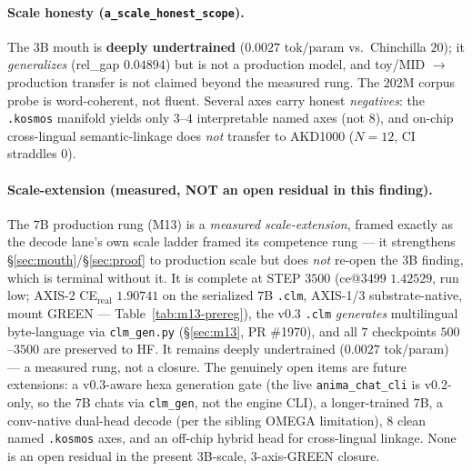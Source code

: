 \documentclass[11pt]{article}
\begin{document}
\paragraph{Scale honesty (\texttt{a\_scale\_honest\_scope}).} The $3$B mouth is
\textbf{deeply undertrained} ($0.0027$ tok/param vs.\ Chinchilla $20$); it
\emph{generalizes} (rel\_gap $0.04894$) but is not a production model, and toy/MID
$\rightarrow$ production transfer is not claimed beyond the measured rung. The
$202$M corpus probe is word-coherent, not fluent. Several axes carry honest
\emph{negatives}: the \texttt{.kosmos} manifold yields only $3$--$4$ interpretable
named axes (not $8$), and on-chip cross-lingual semantic-linkage does \emph{not}
transfer to AKD1000 ($N=12$, CI straddles $0$).

\paragraph{Scale-extension (measured, NOT an open residual in this finding).}
The $7$B production rung (M13) is a \emph{measured scale-extension}, framed exactly as
the decode lane's own scale ladder framed its competence rung --- it strengthens
\S\ref{sec:mouth}/\S\ref{sec:proof} to production scale but does \emph{not} re-open the
$3$B finding, which is terminal without it. It is complete at STEP $3500$ (ce@$3499$
$1.42529$, run low; AXIS-2 CE$_\text{real}$ $1.90741$ on the serialized $7$B \texttt{.clm},
AXIS-1/3 substrate-native, mount GREEN --- Table~\ref{tab:m13-prereg}), the v0.3 \texttt{.clm}
\emph{generates} multilingual byte-language via \texttt{clm\_gen.py} (\S\ref{sec:m13}, PR \#1970),
and all $7$ checkpoints $500$--$3500$ are preserved to HF. It remains deeply undertrained
($0.0027$ tok/param) --- a measured rung, not a closure. The genuinely open items are future
extensions: a v$0.3$-aware hexa generation gate (the live \texttt{anima\_chat\_cli} is v0.2-only,
so the $7$B chats via \texttt{clm\_gen}, not the engine CLI), a longer-trained $7$B, a
conv-native dual-head decode (per the sibling OMEGA limitation), $8$ clean named \texttt{.kosmos}
axes, and an off-chip hybrid head for cross-lingual linkage. None is an open residual in the
present $3$B-scale, 3-axis-GREEN closure.
\end{document}
